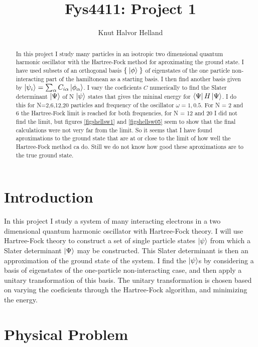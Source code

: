 \documentclass[a4paper,english,12pt]{article}
\title{Fys4411: Project 1}
\author{Knut Halvor Helland}
\begin{document}
\maketitle{}

\begin{abstract}
  In this project I study many particles in an isotropic two dimensional quantum harmonic oscillator with the Hartree-Fock method for aproximating
  the ground state.
  I have used subsets of an orthogonal basis \(\Set{\Ket{\phi}}\) of eigenstates of the one particle non-interacting part of the hamiltonean
  as a starting basis. I then find another basis given by \(\ket{\psi_i} = \sum_\alpha C_{i\alpha}\ket{\phi_\alpha}\). I vary the coeficients $C$
  numerically
  to find the Slater determinant $\Ket{\Psi}$ of N $\ket{\psi}$ states that gives the mininal energy for $\Bra{\Psi}H\Ket{\Psi}$. I do this
  for N=2,6,12,20 particles and frequency of the oscillator $\omega = 1,0.5$. For N = 2 and 6 the Hartree-Fock limit is reached for both frequencies,
  for N = 12 and 20 I did not find the limit, but figures \ref{figshellsw1} and \ref{figshellsw05} seem to show that the final calculations were not
  very far from the limit. So it seems that I have found aproximations to the ground state that are at or close to the limit of how well
  the Hartree-Fock method ca do. Still we do not know how good these aproximations are to the true ground state.
  

\end{abstract}

\section{Introduction}

In this project I study a system of many interacting electrons in a two dimensional quantum harmonic oscillator with Hartree-Fock theory.
I will use Hartree-Fock theory to construct a set of single particle states $\ket{\psi}$ from which a Slater determinant $\Ket{\Psi}$
may be constructed. This Slater determinant is then an approximation of the ground state of the system. I find the $\ket{\psi}$s by considering
a basis of eigenstates of the one-particle non-interacting case, and then apply a unitary transformation of this basis. The unitary transformation
is chosen based on varying the coeficients through the Hartree-Fock algorithm, and minimizing the energy.

\section{Physical Problem}
\end{document}
